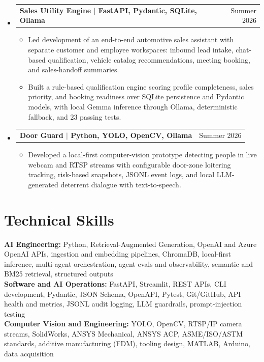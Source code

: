 \documentclass[letterpaper,10pt]{article}
\makeatletter
\newcommand{\resumeItem}[1]{\item\small{#1}}
\newcommand{\resumeProject}[2]{
  \item
  \begin{tabularx}{\textwidth}{@{}Xr@{}}
    \small\textbf{#1} & \small #2 \\
  \end{tabularx}\vspace{-3pt}
}
\makeatother
\begin{document}
\begin{itemize}[leftmargin=0in, label={}]
  \resumeProject{Sales Utility Engine $|$ FastAPI, Pydantic, SQLite, Ollama}{Summer 2026}
  \begin{itemize}
    \resumeItem{Led development of an end-to-end automotive sales assistant with separate customer and employee workspaces: inbound lead intake, chat-based qualification, vehicle catalog recommendations, meeting booking, and sales-handoff summaries.}
    \resumeItem{Built a rule-based qualification engine scoring profile completeness, sales priority, and booking readiness over SQLite persistence and Pydantic models, with local Gemma inference through Ollama, deterministic fallback, and 23 passing tests.}
  \end{itemize}

  \resumeProject{Door Guard $|$ Python, YOLO, OpenCV, Ollama}{Summer 2026}
  \begin{itemize}
    \resumeItem{Developed a local-first computer-vision prototype detecting people in live webcam and RTSP streams with configurable door-zone loitering tracking, risk-based snapshots, JSONL event logs, and local LLM-generated deterrent dialogue with text-to-speech.}
  \end{itemize}
\end{itemize}

\section{Technical Skills}
\small
\textbf{AI Engineering:} Python, Retrieval-Augmented Generation, OpenAI and Azure OpenAI APIs, ingestion and embedding pipelines, ChromaDB, local-first inference, multi-agent orchestration, agent evals and observability, semantic and BM25 retrieval, structured outputs \\
\textbf{Software and AI Operations:} FastAPI, Streamlit, REST APIs, CLI development, Pydantic, JSON Schema, OpenAPI, Pytest, Git/GitHub, API health and metrics, JSONL audit logging, LLM guardrails, prompt-injection testing \\
\textbf{Computer Vision and Engineering:} YOLO, OpenCV, RTSP/IP camera streams, SolidWorks, ANSYS Mechanical, ANSYS ACP, ASME/ISO/ASTM standards, additive manufacturing (FDM), tooling design, MATLAB, Arduino, data acquisition
\end{document}
